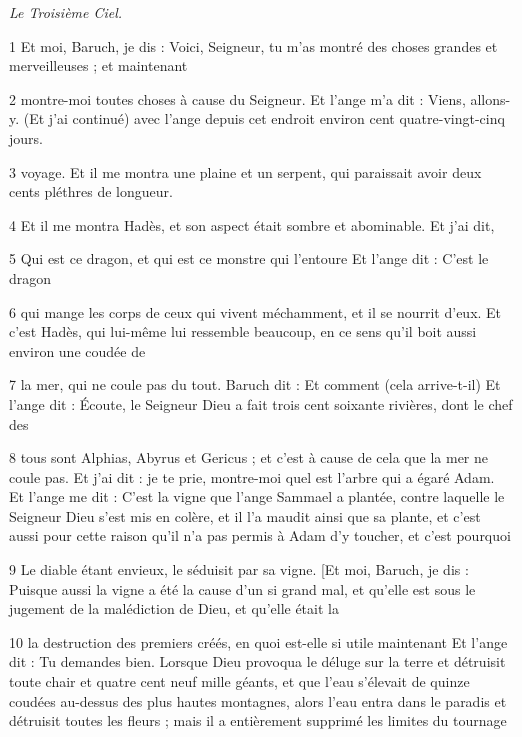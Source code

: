 \par \textit{Le Troisième Ciel.}

\par 1 Et moi, Baruch, je dis : Voici, Seigneur, tu m'as montré des choses grandes et merveilleuses ; et maintenant

\par 2 montre-moi toutes choses à cause du Seigneur. Et l'ange m'a dit : Viens, allons-y. (Et j'ai continué) avec l'ange depuis cet endroit environ cent quatre-vingt-cinq jours.

\par 3 voyage. Et il me montra une plaine et un serpent, qui paraissait avoir deux cents pléthres de longueur.

\par 4 Et il me montra Hadès, et son aspect était sombre et abominable. Et j'ai dit,

\par 5 Qui est ce dragon, et qui est ce monstre qui l'entoure Et l'ange dit : C'est le dragon

\par 6 qui mange les corps de ceux qui vivent méchamment, et il se nourrit d'eux. Et c'est Hadès, qui lui-même lui ressemble beaucoup, en ce sens qu'il boit aussi environ une coudée de

\par 7 la mer, qui ne coule pas du tout. Baruch dit : Et comment (cela arrive-t-il) Et l'ange dit : Écoute, le Seigneur Dieu a fait trois cent soixante rivières, dont le chef des

\par 8 tous sont Alphias, Abyrus et Gericus ; et c'est à cause de cela que la mer ne coule pas. Et j’ai dit : je te prie, montre-moi quel est l’arbre qui a égaré Adam. Et l'ange me dit : C'est la vigne que l'ange Sammael a plantée, contre laquelle le Seigneur Dieu s'est mis en colère, et il l'a maudit ainsi que sa plante, et c'est aussi pour cette raison qu'il n'a pas permis à Adam d'y toucher, et c'est pourquoi

\par 9 Le diable étant envieux, le séduisit par sa vigne. [Et moi, Baruch, je dis : Puisque aussi la vigne a été la cause d'un si grand mal, et qu'elle est sous le jugement de la malédiction de Dieu, et qu'elle était la

\par 10 la destruction des premiers créés, en quoi est-elle si utile maintenant Et l'ange dit : Tu demandes bien. Lorsque Dieu provoqua le déluge sur la terre et détruisit toute chair et quatre cent neuf mille géants, et que l'eau s'élevait de quinze coudées au-dessus des plus hautes montagnes, alors l'eau entra dans le paradis et détruisit toutes les fleurs ; mais il a entièrement supprimé les limites du tournage

